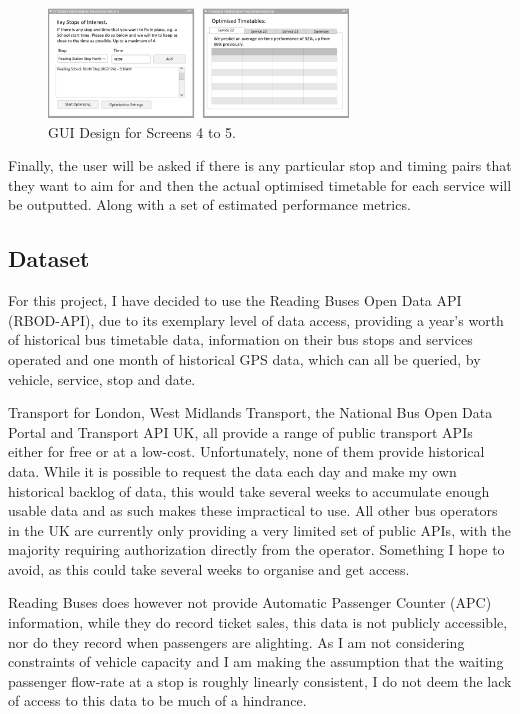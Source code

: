 \documentclass{article}
\begin{document}
\begin{figure}[H]
	\centering
	\includegraphics[height=110px]{images/GUI_2.png}
	\caption{GUI Design for Screens 4 to 5.}
	\label{fig:gui2}
\end{figure}

Finally, the user will be asked if there is any particular stop and timing pairs that they want to aim for and then the actual optimised timetable for each service will be outputted. Along with a set of estimated performance metrics. 


\subsection{Dataset}
For this project, I have decided to use the Reading Buses Open Data API (RBOD-API), due to its exemplary level of data access, providing a year's worth of historical bus timetable data, information on their bus stops and services operated and one month of historical GPS data, which can all be queried, by vehicle, service, stop and date. 

\par
Transport for London, West Midlands Transport, the National Bus Open Data Portal and Transport API UK, all provide a range of public transport APIs either for free or at a low-cost. Unfortunately, none of them provide historical data. While it is possible to request the data each day and make my own historical backlog of data, this would take several weeks to accumulate enough usable data and as such makes these impractical to use. All other bus operators in the UK are currently only providing a very limited set of public APIs, with the majority requiring authorization directly from the operator. Something I hope to avoid, as this could take several weeks to organise and get access. 


\par
Reading Buses does however not provide Automatic Passenger Counter (APC) information, while they do record ticket sales, this data is not publicly accessible, nor do they record when passengers are alighting. As I am not considering constraints of vehicle capacity and I am making the assumption that the waiting passenger flow-rate at a stop is roughly linearly consistent, I do not deem the lack of access to this data to be much of a hindrance. 
\end{document}
